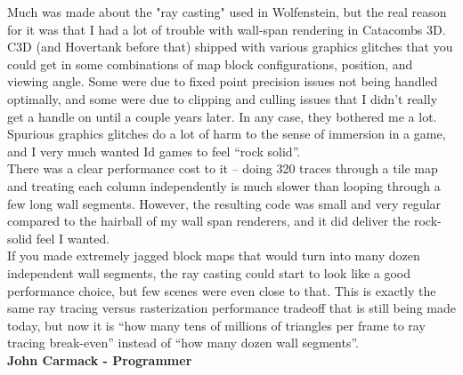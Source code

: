 \documentclass[book.tex]{subfiles}
\begin{document}
\begin{fancyquotes}
Much was made about the "ray casting" used in Wolfenstein, but the real reason for it was that I had a lot of trouble with wall-span rendering in Catacombs 3D.  C3D (and Hovertank before that) shipped with various graphics glitches that you could get in some combinations of map block configurations, position, and viewing angle.  Some were due to fixed point precision issues not being handled optimally, and some were due to clipping and culling issues that I didn’t really get a handle on until a couple years later.  In any case, they bothered me a lot.  Spurious graphics glitches do a lot of harm to the sense of immersion in a game, and I very much wanted Id games to feel “rock solid”.
 \bigskip \\
There was a clear performance cost to it – doing 320 traces through a tile map and treating each column independently is much slower than looping through a few long wall segments.  However, the resulting code was small and very regular compared to the hairball of my wall span renderers, and it did deliver the rock-solid feel I wanted.
 \bigskip \\
If you made extremely jagged block maps that would turn into many dozen independent wall segments, the ray casting could start to look like a good performance choice, but few scenes were even close to that.  This is exactly the same ray tracing versus rasterization performance tradeoff that is still being made today, but now it is “how many tens of millions of triangles per frame to ray tracing break-even” instead of “how many dozen wall segments”.
 \bigskip \\
\textbf{John Carmack - Programmer}
 \end{fancyquotes}
 
\end{document}
